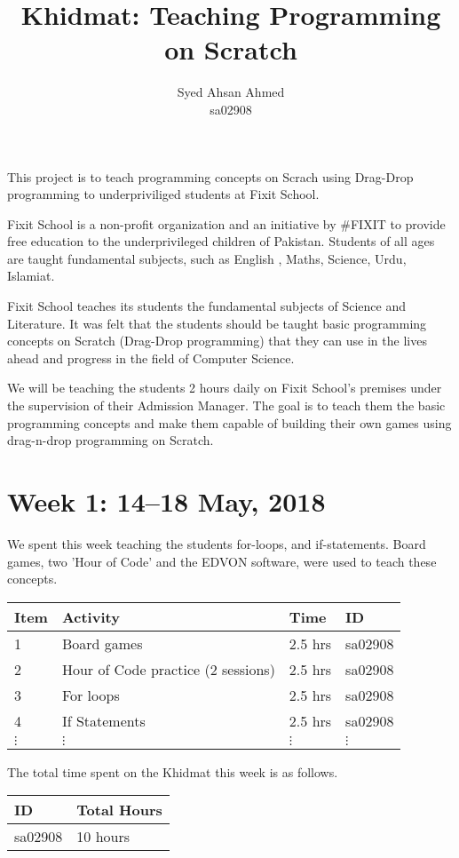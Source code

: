 \documentclass{article}
\title {Khidmat: Teaching Programming on Scratch}
\author{
  Syed Ahsan Ahmed\\ sa02908
}
\date{}
\begin{document}
\maketitle

This project is to teach programming concepts on Scrach using Drag-Drop programming to underpriviliged students at Fixit School.

Fixit School is a non-profit organization and an initiative by #FIXIT to provide free education to the underprivileged children of Pakistan. Students of all ages are taught fundamental subjects, such as English , Maths, Science, Urdu, Islamiat. 

Fixit School teaches its students the fundamental subjects of Science and Literature. It was felt that the students should be taught basic programming concepts on Scratch (Drag-Drop programming) that they can use in the lives ahead and progress in the field of Computer Science.

We will be teaching the students 2 hours daily on Fixit School's premises under the supervision of their Admission Manager. The goal is to teach them the basic programming concepts and make them capable of building their own games using drag-n-drop programming on Scratch.

\newpage
\section*{Week 1: 14--18 May, 2018}

We spent this week teaching the students for-loops, and if-statements. Board games, two 'Hour of Code' and the EDVON software, were used to teach these concepts.

\begin{tabular}{|l|l|l|l|}
  \hline
  Item 	& Activity & Time & ID \\\hline\hline
  1	& Board games & 2.5 hrs & sa02908 \\\hline
  2	& Hour of Code practice (2 sessions) & 2.5 hrs & sa02908 \\\hline
  3	& For loops & 2.5 hrs & sa02908 \\\hline
  4 & If Statements & 2.5 hrs & sa02908 \\\hline
  $\vdots$ & $\vdots$ & $\vdots$ & $\vdots$ \\\hline
\end{tabular}

The total time spent on the Khidmat this week is as follows.

\begin{tabular}{|l|l|}
  \hline
  ID & Total Hours\\\hline\hline
  sa02908 & 10 hours\\\hline
\end{tabular}
\end{document}
